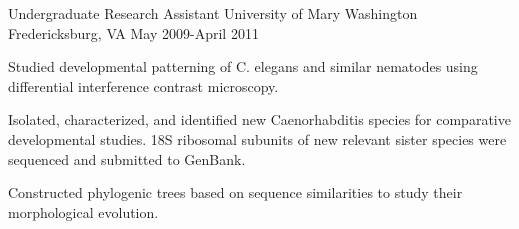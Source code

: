 \begin{cventries}
\cventry
{Undergraduate Research Assistant} %
{University of Mary Washington} %
{Fredericksburg,  VA} %
{May 2009-April 2011} %
{
  \begin{cvitems} %
    \item {Studied developmental patterning of C. elegans and similar nematodes using differential interference contrast microscopy.}
    \item {Isolated, characterized, and identified new Caenorhabditis species for comparative developmental studies. 18S ribosomal subunits of new relevant sister species were sequenced and submitted to GenBank.}
    \item {Constructed phylogenic trees based on sequence similarities to study their morphological evolution.}
  \end{cvitems}
}

\end{cventries}
